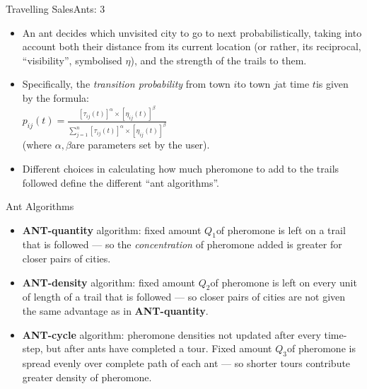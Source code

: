 \documentclass{article}
\begin{document}
\begin{slide}{}
{\Large Travelling SalesAnts: 3}
\begin{itemize}
\item An ant decides which unvisited city to go to next
probabilistically, taking into account both their distance from its
current location (or rather, its reciprocal, ``visibility'',
symbolised $\eta$), and the strength
of the trails to them.
\item Specifically, the {\em transition probability} from town $i$\space to
town $j$\space at time $t$\space is given by the formula:\\\hspace*{1cm}$p_{ij}(t) =
\frac{[\tau_{ij}(t)]^{\alpha}\times[\eta_{ij}(t)]^{\beta}}{\sum_{j=1}^n[\tau_{ij}(t)]^{\alpha}\times[\eta_{ij}(t)]^{\beta}}$\\(where $\alpha, \beta$\space are parameters set by the user).
\item Different choices in calculating how much pheromone to add to
the trails followed define the different ``ant algorithms''.
\end{itemize}
\end{slide}

\begin{slide}{}
{\Large Ant Algorithms}
\begin{itemize}
\item {\bf ANT-quantity} algorithm: fixed amount $Q_1$\space of
pheromone is left on a trail that is followed --- so the {\em
concentration} of pheromone added is greater for closer pairs of cities.
\item {\bf ANT-density} algorithm: fixed amount $Q_2$\space of
pheromone is left on every unit of length of a trail that is followed
--- so closer pairs of cities are not given the same advantage as in
{\bf ANT-quantity}.
\item {\bf ANT-cycle} algorithm: pheromone densities
not updated after every time-step, but after ants have
completed a tour. Fixed amount $Q_3$\space of
pheromone is spread evenly over complete path of each ant --- so
shorter tours contribute greater density of pheromone.
\end{itemize}
\end{slide}
\end{document}
